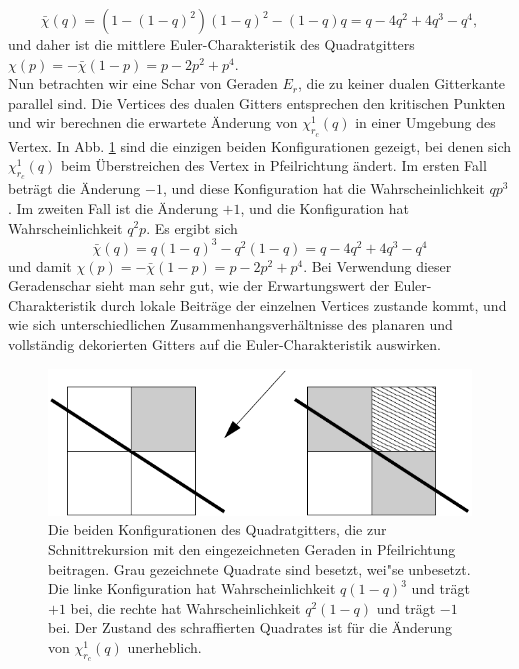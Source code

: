 \begin{equation}
\label{eq:chisquare}
\bar{\chi}(q)=(1-(1-q)^2)(1-q)^2-(1-q)q=q-4q^2+4q^3-q^4,
\end{equation} 
und daher ist die mittlere Euler-Charakteristik des Quadratgitters $\chi(p)=-\bar{\chi}(1-p)=p-2p^2+p^4$.\\
Nun betrachten wir eine Schar von Geraden $E_r$, die zu keiner dualen Gitterkante parallel sind. Die Vertices des dualen Gitters entsprechen den kritischen Punkten und wir berechnen die erwartete \"Anderung von $\chi^1_{r_c}(q)$ in einer Umgebung des Vertex. In Abb. \ref{fig:morsequadrat} sind die einzigen beiden Konfigurationen gezeigt, bei denen sich $\chi^1_{r_c}(q)$ beim \"Uberstreichen des Vertex in Pfeilrichtung \"andert. Im ersten Fall betr\"agt die \"Anderung $-1$, und diese Konfiguration hat die Wahrscheinlichkeit $qp^3$. Im zweiten Fall ist die \"Anderung $+1$, und die Konfiguration hat Wahrscheinlichkeit $q^2p$. Es ergibt sich 
\begin{equation}
\bar{\chi}(q)=q(1-q)^3-q^2(1-q)=q-4q^2+4q^3-q^4
\end{equation} 
und damit $\chi(p)=-\bar{\chi}(1-p)=p-2p^2+p^4$.
Bei Verwendung dieser Geradenschar sieht man sehr gut, wie der Erwartungswert der Euler-Charakteristik durch lokale Beitr\"age der einzelnen Vertices zustande kommt, und wie sich unterschiedlichen Zusammenhangsverh\"altnisse des planaren und vollst\"andig dekorierten Gitters auf die Euler-Charakteristik auswirken.
\begin{figure}[hbtp]
  \centering
  \includegraphics{./Euler-figs/morsequadrat}
  \caption{Die beiden Konfigurationen des Quadratgitters, die zur Schnittrekursion mit den eingezeichneten Geraden in Pfeilrichtung beitragen. Grau gezeichnete Quadrate sind besetzt, wei"se unbesetzt. Die linke Konfiguration hat Wahrscheinlichkeit $q(1-q)^3$ und tr\"agt $+1$ bei, die rechte hat Wahrscheinlichkeit $q^2(1-q)$ und tr\"agt $-1$ bei. Der Zustand des schraffierten Quadrates ist f\"ur die \"Anderung von $\chi^1_{r_c}(q)$ unerheblich.}
  \label{fig:morsequadrat}
\end{figure}
